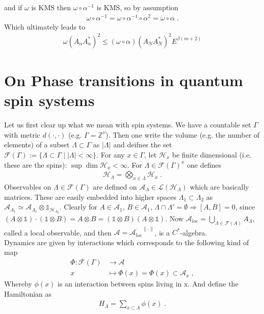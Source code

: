 \documentclass[
a4paper, %
11pt, %
onecolumn, %
openany, %
]{memoir}
\theoremstyle{definition}
\theoremstyle{remark}
\theoremstyle{plain}
\begin{document}
and if $\omega$ is KMS then $\omega\circ\alpha^{-1}$ is KMS, so by assumption \begin{align}
\omega\circ\alpha^{-1}=\omega\circ\alpha^{-1}\circ\alpha^2=\omega\circ\alpha\; .
\end{align}
Which ultimately leads to \begin{align}
\omega(A_nA_n^*)^2\leq (\omega\circ\alpha)(A_NA_N^*)^2E^{\beta(m+2)}
\end{align}
\chapter{On Phase transitions in quantum spin systems}
Let us first clear up what we mean with spin systems. We have a countable set $\Gamma$ with metric $d(\cdot,\cdot)$ (e.g. $\Gamma=\mathbb{Z}^{\nu}$). Then one write the volume (e.g. the number of elements) of a subset $\Lambda\subset\Gamma$ as $|\Lambda|$ and deifnes the set $\mathcal{F}(\Gamma):=\{\Lambda\subset\Gamma\mid |\Lambda|<\infty\}$. For any $x\in\Gamma$, let $\mathcal{H}_x$ be finite dimensional (i.e. these are the spins): $\sup\dim\mathcal{H}_x<\infty$. For $\Lambda\in\mathcal{F}(\Gamma)^x$ one defines \begin{align}
\mathcal{H}_{\Lambda}=\bigotimes_{x\in\Lambda}\mathcal{H}_x\; .
\end{align}
Observables on $\Lambda\in\mathcal{F}(\Gamma)$ are defined on $\mathcal{A}_{\Lambda}\in\mathcal{L}(\mathcal{H}_{\Lambda})$ which are basically matrices. These are easily embedded into higher spaces $\Lambda_1\subset\Lambda_2$ as $\mathcal{A}_{\Lambda_1}\simeq \mathcal{A}_{\Lambda_1}\otimes\mathds{1}_{\mathcal{H}_{\Lambda_2}}$. Clearly for $A\in\mathcal{A}_1$, $B\in\mathcal{A}_1$, $\Lambda\cap\Lambda'=\emptyset\Rightarrow[A,B]=0$, since $(A\otimes \mathds{1})\cdot(\mathds{1}\otimes B)=A\otimes B=(\mathds{1}\otimes B)(A\otimes\mathds{1})$. Now $\mathcal{A}_{loc}=\bigcup_{\Lambda\in\mathcal{F}(A)}A_{\Lambda}$, called a local observable, and then $\mathcal{A}=\overline{\mathcal{A}_{loc}}^{\|\cdot\|}$, is a $C^*$-algebra.\\
Dynamics are given by interactions which corresponds to the following kind of map \begin{align}
\Phi:\mathcal{F}(\Gamma)&\longrightarrow \mathcal{A}\\
x &\longmapsto \Phi(x)=\Phi(x)\subset \mathcal{A}_x\; ,
\end{align}
Whereby $\phi(x)$ is an interaction between spins living in x. And define the Hamiltonian as \begin{align}
H_{\Lambda}=\sum_{x\subset\Lambda}\phi(x)\; .
\end{align}
\end{document}
